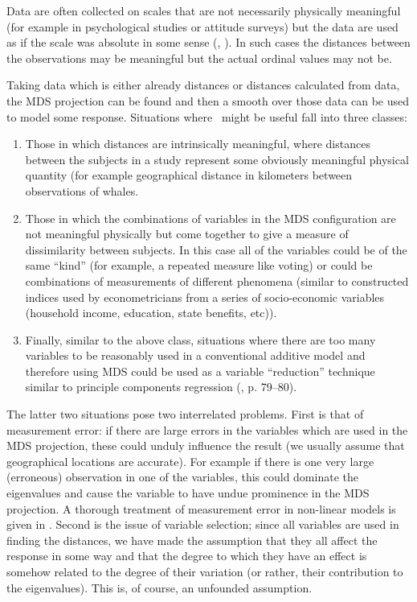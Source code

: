 Data are often collected on scales that are not necessarily physically meaningful (for example in psychological studies or attitude surveys) but the data are used as if the scale was absolute in some sense (\cite{cox2007}, \cite{torgerson}). In such cases the distances between the observations may be meaningful but the actual ordinal values may not be.

Taking data which is either already distances or distances calculated from data, the MDS projection can be found and then a smooth over those data can be used to model some response. Situations where \mdsds\ might be useful fall into three classes: 
\begin{enumerate}
\item Those in which distances are intrinsically meaningful, where distances between the subjects in a study represent some obviously meaningful physical quantity (for example geographical distance in kilometers between observations of whales.
\item Those in which the combinations of variables in the MDS configuration are not meaningful physically but come together to give a measure of dissimilarity between subjects. In this case all of the variables could be of the same ``kind'' (for example, a repeated measure like voting) or could be combinations of measurements of different phenomena (similar to constructed indices used by econometricians from a series of socio-economic variables (household income, education, state benefits, etc)).
\item Finally, similar to the above class, situations where there are too many variables to be reasonably used in a conventional additive model and therefore using MDS could be used as a variable ``reduction'' technique similar to principle components regression (\cite{elements}, p. 79--80).
\end{enumerate}
The latter two situations pose two interrelated problems. First is that of measurement error: if there are large errors in the variables which are used in the MDS projection, these could unduly influence the result (we usually assume that geographical locations are accurate). For example if there is one very large (erroneous) observation in one of the variables, this could dominate the eigenvalues and cause the variable to have undue prominence in the MDS projection. A thorough treatment of measurement error in non-linear models is given in \cite{measurementerror}. Second is the issue of variable selection; since all variables are used in finding the distances, we have made the assumption that they all affect the response in some way and that the degree to which they have an effect is somehow related to the degree of their variation (or rather, their contribution to the eigenvalues). This is, of course, an unfounded assumption.

